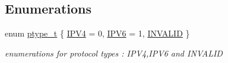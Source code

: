 \subsection*{Enumerations}
\begin{DoxyCompactItemize}
\item 
enum \hyperlink{group__FAPI__MCAST_ga723256dea8a6fd9c487829bc1ed6f911}{ptype\-\_\-t} \{ \hyperlink{group__FAPI__MCAST_gga723256dea8a6fd9c487829bc1ed6f911acfc4c1053c60b6cc2a7776c60969f31f}{I\-P\-V4} = 0, 
\hyperlink{group__FAPI__MCAST_gga723256dea8a6fd9c487829bc1ed6f911aff712168361fe68b2bb6193df4977d3c}{I\-P\-V6} = 1, 
\hyperlink{group__FAPI__MCAST_gga723256dea8a6fd9c487829bc1ed6f911aef2863a469df3ea6871d640e3669a2f2}{I\-N\-V\-A\-L\-I\-D}
 \}
\begin{DoxyCompactList}\small\item\em enumerations for protocol types \-: I\-P\-V4,I\-P\-V6 and I\-N\-V\-A\-L\-I\-D \end{DoxyCompactList}\end{DoxyCompactItemize}
